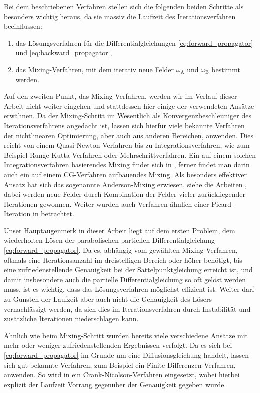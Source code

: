 %
Bei dem beschriebenen Verfahren stellen sich die folgenden beiden Schritte als besonders wichtig heraus, da sie massiv die Laufzeit des Iterationsverfahren beeinflussen:
\begin{enumerate}[label={\itshape\roman*.}]
    \item das Lösungsverfahren für die Differentialgleichungen \cref{eq:forward_propagator} und \cref{eq:backward_propagator},
    \item das Mixing-Verfahren, mit dem iterativ neue Felder $\omega_{\mathrm{A}}$ und $\omega_{\mathrm{B}}$ bestimmt werden.
\end{enumerate}
%
Auf den zweiten Punkt, das Mixing-Verfahren, werden wir im Verlauf dieser Arbeit nicht weiter eingehen und stattdessen hier einige der verwendeten Ansätze erwähnen.
Da der Mixing-Schritt im Wesentlich als Konvergenzbeschleuniger des Iterationsverfahrens angedacht ist, lassen sich hierfür viele bekannte Verfahren der nichtlinearen Optimierung, aber auch aus anderen Bereichen, anwenden.
Dies reicht von einem Quasi-Newton-Verfahren \cite{Matsen:1994bz} bis zu Integrationsverfahren, wie zum Beispiel Runge-Kutta-Verfahren oder Mehrschrittverfahren.
Ein auf einem solchen Integrationsverfahren basierendes Mixing findet sich in \cite{Ceniceros:2006is}, ferner findet man darin auch ein auf einem CG-Verfahren aufbauendes Mixing.
Als besonders effektiver Ansatz hat sich das sogenannte Anderson-Mixing erwiesen, siehe die Arbeiten \cite{Thompson:2004um,Stasiak:2011ba}, dabei werden neue Felder durch Kombination der Felder vieler zurückliegender Iterationen gewonnen.
Weiter wurden auch Verfahren ähnlich einer Picard-Iteration in \cite{Drolet:1999bs} betrachtet.

Unser Hauptaugenmerk in dieser Arbeit liegt auf dem ersten Problem, dem wiederholten Lösen der parabolischen partiellen Differentialgleichung \cref{eq:forward_propagator}.
Da es, abhängig vom gewählten Mixing-Verfahren, oftmals eine Iterationsanzahl im dreistelligen Bereich oder höher benötigt, bis eine zufriedenstellende Genauigkeit bei der Sattelpunktgleichung erreicht ist, und damit insbesondere auch die partielle Differentialgleichung so oft gelöst werden muss, ist es wichtig, dass das Lösungsverfahren möglichst effizient ist.
Weiter darf zu Gunsten der Laufzeit aber auch nicht die Genauigkeit des Lösers vernachlässigt werden, da sich dies im Iterationsverfahren durch Instabilität und zusätzliche Iterationen niederschlagen kann.

Ähnlich wie beim Mixing-Schritt wurden bereits viele verschiedene Ansätze mit mehr oder weniger zufriedenstellenden Ergebnissen verfolgt.
Da es sich bei \cref{eq:forward_propagator} im Grunde um eine Diffusionsgleichung handelt, lassen sich gut bekannte Verfahren, zum Beispiel ein Finite-Differenzen-Verfahren, anwenden.
So wird in \cite{Drolet:1999bs} ein Crank-Nicolson-Verfahren eingesetzt, wobei hierbei explizit der Laufzeit Vorrang gegenüber der Genauigkeit gegeben wurde.

